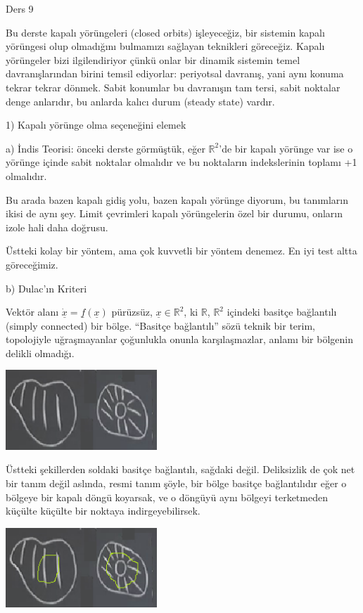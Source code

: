 \documentclass[12pt,fleqn]{article}\usepackage{../../common}
\begin{document}
Ders 9

Bu derste kapalı yörüngeleri (closed orbits) işleyeceğiz, bir sistemin kapalı
yörüngesi olup olmadığını bulmamızı sağlayan teknikleri göreceğiz. Kapalı
yörüngeler bizi ilgilendiriyor çünkü onlar bir dinamik sistemin temel
davranışlarından birini temsil ediyorlar: periyotsal davranış, yani aynı konuma
tekrar tekrar dönmek. Sabit konumlar bu davranışın tam tersi, sabit noktalar
denge anlarıdır, bu anlarda kalıcı durum (steady state) vardır.

1) Kapalı yörünge olma seçeneğini elemek

a) İndis Teorisi: önceki derste görmüştük, eğer $\mathbb{R}^2$'de bir kapalı
yörünge var ise o yörünge içinde sabit noktalar olmalıdır ve bu noktaların
indekslerinin toplamı +1 olmalıdır.

Bu arada bazen kapalı gidiş yolu, bazen kapalı yörünge diyorum, bu tanımların
ikisi de aynı şey. Limit çevrimleri kapalı yörüngelerin özel bir durumu, onların
izole hali daha doğrusu.

Üstteki kolay bir yöntem, ama çok kuvvetli bir yöntem denemez. En iyi test altta
göreceğimiz.

b) Dulac'ın Kriteri

Vektör alanı $\dot{\underline{x}} = \underline{f}(\underline{x})$ pürüzsüz,
$\underline{x} \in \mathbb{R}^2$, ki $\mathbb{R}$, $\mathbb{R}^2$ içindeki
basitçe bağlantılı (simply connected) bir bölge. ``Basitçe bağlantılı'' sözü
teknik bir terim, topolojiyle uğraşmayanlar çoğunlukla onunla karşılaşmazlar,
anlamı bir bölgenin delikli olmadığı. 

\includegraphics[height=3cm]{09_01.png}

Üstteki şekillerden soldaki basitçe bağlantılı, sağdaki değil. Deliksizlik de
çok net bir tanım değil aslında, resmi tanım şöyle, bir bölge basitçe
bağlantılıdır eğer o bölgeye bir kapalı döngü koyarsak, ve o döngüyü aynı
bölgeyi terketmeden küçülte küçülte bir noktaya indirgeyebilirsek.

\includegraphics[height=3cm]{09_02.png}
\end{document}
